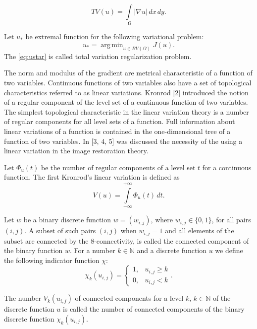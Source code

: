 \documentclass{llncs}
\newcommand*{\N}{\mathbb{N} \xspace}
\DeclareMathOperator*{\argmin}{arg\,min}
\begin{document}
\begin{equation}
  TV(u) = \int\limits_{\Omega} |\nabla u|\,dx\,dy.
  \label{eq:TV}
\end{equation}

Let $u_*$ be extremal function for the following variational problem:
\begin{equation}
  u_* = \argmin_{u \in BV(\Omega)} J(u).
  \label{eq:ustar}
\end{equation}
The \autoref{eq:ustar} is called total variation regularization problem.

The norm and modulus of the gradient are metrical characteristic of a function of
two variables.
Continuous functions of two variables also have a set of topological
characteristics referred to as linear variations.
Kronrod [2] %
introduced the notion of a regular component of the level set of a
continuous function of two variables.
The simplest topological characteristic in the linear variation theory is a number
of regular components for all level sets of a function.
Full information about linear variations of a function is contained in the
one-dimensional tree of a function of two variables.
In [3, 4, 5] %
was discussed the necessity of the using a linear variation in the
image restoration theory.

Let $\Phi_u(t)$ be the number of regular components of a level set $t$
for a continuous function.
The first Kronrod's linear variation is defined as
\begin{equation}
  V(u) = \int\limits_{-\infty}^{+\infty} \Phi_u(t)\,dt.
  \label{eq:KronrodVariation}
\end{equation}

Let $w$ be a binary discrete function $w=(w_{i,j})$, where $w_{i,j} \in \{0,1\}$,
for all pairs $(i,j)$.
A subset of such pairs $(i, j)$ when $w_{i,j}=1$ and all elements of the subset are
connected by the 8-connectivity, is called the connected component of the binary
function $w$.
For a number $k \in \N$ and a discrete function $u$ we define the following
indicator function $\chi$:
\begin{equation}
  \chi_k (u_{i,j}) =
    \begin{cases}
      1, & u_{i,j} \ge k \\
      0, & u_{i,j} < k
    \end{cases}.
  \label{eq:chiIndicator}
\end{equation}

\begin{definition}
  The number $V_k(u_{i,j})$ of connected components for a level $k$, $k \in \N$ of
  the discrete function $u$ is called the number of connected components of the 
  binary discrete function $\chi_k(u_{i,j})$.
\end{definition}
\end{document}

